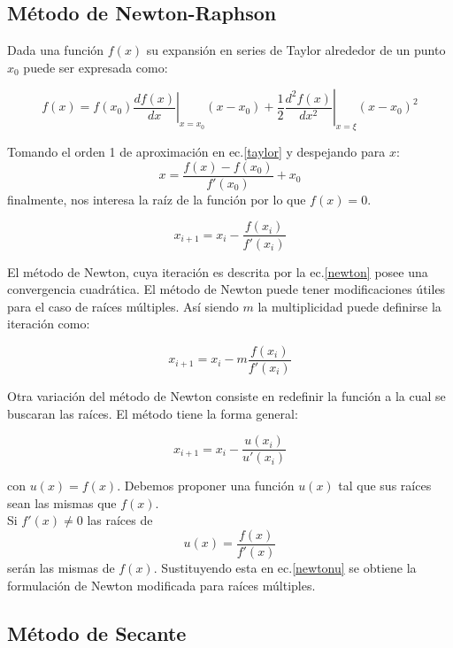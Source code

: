 \documentclass[letterpaper,10pt,oneside]{sphinxmanual}
\theoremstyle{plain}%
\theoremstyle{definition}%
\theoremstyle{remark}%
\newcommand{\derivada}[2]{\frac{d #1}{d#2}}
\newcommand{\derivadan}[3]{\frac{d^{#3} #1}{d#2^{#3}}}
\newcommand{\evaluar}[2]{\left. #1 \right | _{#2}}
\begin{document}
\subsection{Método de Newton-Raphson}

\medskip Dada una función $f(x)$ su expansión en series de Taylor alrededor de un punto $x_{0}$ puede ser expresada como:\medskip

\begin{equation}
 f(x)=f(x_{0})\evaluar{\derivada{f(x)}{x}}{x=x_{0}}(x-x_{0})+\frac{1}{2}\evaluar{\derivadan{f(x)}{x}{2}}{x=\xi}(x-x_{0})^{2} \label{taylor}
\end{equation}

\noindent Tomando el orden 1 de aproximación en ec.\ref{taylor} y despejando para $x$: \[ x=\frac{f(x)-f(x_{0})}{f\prime(x_{0})}+x_{0}\] finalmente, nos interesa la raíz de la función por lo que $f(x)=0$.\medskip

\begin{equation}
 x_{i+1}=x_{i}-\frac{f(x_{i})}{f\prime(x_{i})} \label{newton}
\end{equation}

\noindent El método de Newton, cuya iteración es descrita por la ec.\ref{newton} posee una convergencia cuadrática. El método de Newton puede tener modificaciones útiles para el caso de raíces múltiples. Así siendo $m$ la multiplicidad puede definirse la iteración como:\medskip

\begin{equation}
 x_{i+1}=x_{i}-m\frac{f(x_{i})}{f\prime(x_{i})} \label{mnewton}
\end{equation}

\noindent Otra variación del método de Newton consiste en redefinir la función a la cual se buscaran las raíces. El método tiene la forma general:\medskip

\begin{equation}
x_{i+1}=x_{i}-\frac{u(x_{i})}{u\prime(x_{i})} \label{newtonu}
\end{equation}

\noindent con $u(x)=f(x)$. Debemos proponer una función $u(x)$ tal que sus raíces sean las mismas que $f(x)$.\\
Si $f\prime(x)\neq 0$ las raíces de \[ u(x)=\frac{f(x)}{f\prime(x)}\] serán las mismas de $f(x)$. Sustituyendo esta en ec.\ref{newtonu} se obtiene la formulación de Newton modificada para raíces múltiples.\medskip

\subsection{Método de Secante}
\end{document}
